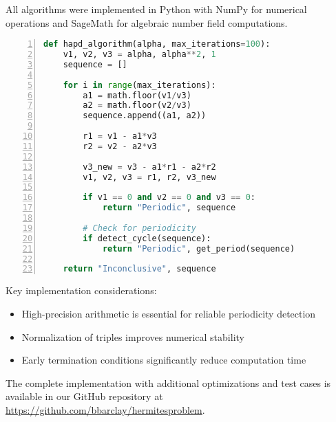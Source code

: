 All algorithms were implemented in Python with NumPy for numerical operations and SageMath for algebraic number field computations.

\begin{lstlisting}[language=Python, caption=Basic implementation of HAPD algorithm, frame=single, numbers=left, basicstyle=\small\ttfamily]
def hapd_algorithm(alpha, max_iterations=100):
    v1, v2, v3 = alpha, alpha**2, 1
    sequence = []

    for i in range(max_iterations):
        a1 = math.floor(v1/v3)
        a2 = math.floor(v2/v3)
        sequence.append((a1, a2))

        r1 = v1 - a1*v3
        r2 = v2 - a2*v3

        v3_new = v3 - a1*r1 - a2*r2
        v1, v2, v3 = r1, r2, v3_new

        if v1 == 0 and v2 == 0 and v3 == 0:
            return "Periodic", sequence

        # Check for periodicity
        if detect_cycle(sequence):
            return "Periodic", get_period(sequence)

    return "Inconclusive", sequence
\end{lstlisting}

Key implementation considerations:
\begin{itemize}
    \item High-precision arithmetic is essential for reliable periodicity detection
    \item Normalization of triples improves numerical stability
    \item Early termination conditions significantly reduce computation time
\end{itemize}

The complete implementation with additional optimizations and test cases is available in our GitHub repository at \url{https://github.com/bbarclay/hermitesproblem}.